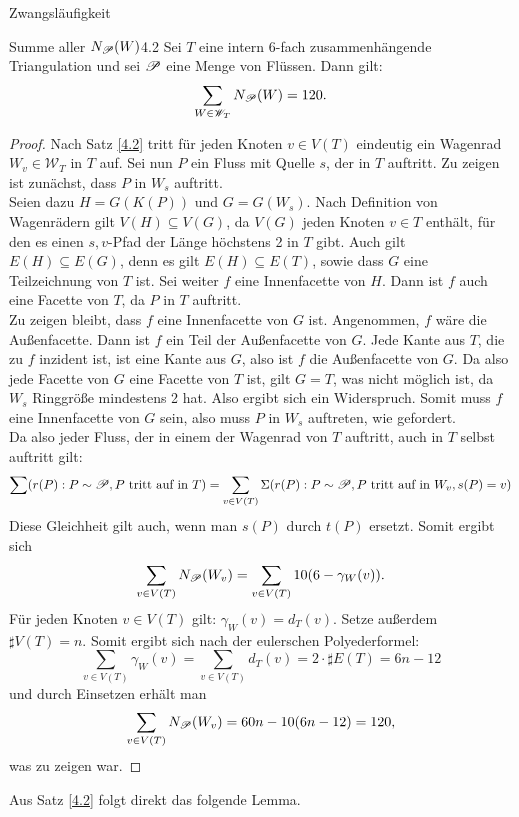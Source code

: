 \begin{section}{Zwangsläufigkeit}
 \begin{satzl}{Summe aller $N_{\mathscr{P}}(W)$}{4.2}
  Sei $T$ eine intern 6-fach zusammenhängende Triangulation und sei $\mathscr{P}$ eine Menge von Flüssen. Dann gilt:
  \[\sum_{W\in \mathscr{W}_T} N_{\mathscr{P}}(W) = 120\text{.}\]
 \end{satzl}
 \begin{proof}
  Nach Satz \ref{4.2} tritt für jeden Knoten $v \in V(T)$ eindeutig ein Wagenrad $W_v \in \mathscr{W}_T$ in $T$ auf. Sei nun $P$ ein Fluss mit Quelle $s$, der in $T$ auftritt. Zu zeigen ist zunächst, dass $P$ in $W_s$ auftritt.\\
  Seien dazu $H=G(K(P))$ und $G=G(W_s)$. Nach Definition von Wagenrädern gilt $V(H) \subseteq V(G)$, da $V(G)$ jeden Knoten $v \in T$ enthält, für den es einen $s,v$-Pfad   der Länge höchstens 2 in $T$ gibt. Auch gilt $E(H) \subseteq E(G)$, denn es gilt $E(H) \subseteq E(T)$, sowie dass $G$ eine Teilzeichnung von $T$ ist. Sei weiter $f$ eine Innenfacette von $H$. Dann ist $f$ auch eine Facette von $T$, da $P$ in $T$ auftritt.\\
  Zu zeigen bleibt, dass $f$ eine Innenfacette von $G$ ist. Angenommen, $f$ wäre die Außenfacette. Dann ist $f$ ein Teil der Außenfacette von $G$. Jede Kante aus $T$, die zu $f$ inzident ist, ist eine Kante aus $G$, also ist $f$ die Außenfacette von $G$. Da also jede Facette von $G$ eine Facette von $T$ ist, gilt $G=T$, was nicht möglich ist, da $W_s$ Ringgröße mindestens 2 hat. Also ergibt sich ein Widerspruch. Somit muss $f$ eine Innenfacette von $G$ sein, also muss $P$ in $W_s$ auftreten, wie gefordert.\\
  Da also jeder Fluss, der in einem der Wagenrad von $T$ auftritt, auch in $T$ selbst auftritt gilt:
  \[\sum (r(P):P\sim \mathscr{P}, P \text{ tritt auf in } T) = \sum_{v\in V(T)} \Sigma (r(P):P\sim \mathscr{P}, P \text{ tritt auf in } W_v,s(P)=v)\]
  Diese Gleichheit gilt auch, wenn man $s(P)$ durch $t(P)$ ersetzt. Somit ergibt sich
  \[\sum_{v\in V(T)} N_{\mathscr{P}}(W_v) = \sum_{v\in V(T)} 10(6-\gamma_W(v))\text{.}\]
  Für jeden Knoten $v \in V(T)$ gilt: $\gamma_W(v) = d_T(v)$. Setze außerdem $\sharp V(T) = n$. Somit ergibt sich nach der eulerschen Polyederformel:
  \[\sum_{v\in V(T)} \gamma_W(v) = \sum_{v\in V(T)} d_T(v) = 2\cdot \sharp E(T) = 6n -12\]
  und durch Einsetzen erhält man
  \[\sum_{v\in V(T)} N_{\mathscr{P}}(W_v) = 60n - 10(6n - 12) = 120\text{,}\]
  was zu zeigen war.
 \end{proof}

 Aus Satz \ref{4.2} folgt direkt das folgende Lemma.
 

\end{section}
